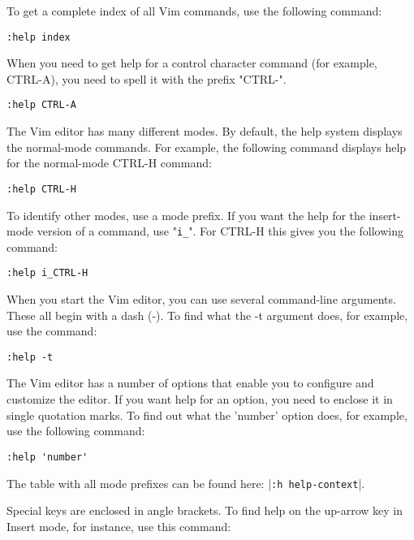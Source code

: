 To get a complete index of all Vim commands, use the following command:

 \begin{Verbatim}[samepage=true]
 :help index
 \end{Verbatim}

When you need to get help for a control character command (for example, CTRL-A), you need to spell it with the prefix "CTRL-".

 \begin{Verbatim}[samepage=true]
 :help CTRL-A
 \end{Verbatim}

The Vim editor has many different modes.
By default, the help system displays the normal-mode commands.
For example, the following command displays help for the normal-mode CTRL-H command: 

 \begin{Verbatim}[samepage=true]
 :help CTRL-H
 \end{Verbatim}

To identify other modes, use a mode prefix.
If you want the help for the insert-mode version of a command, use "\verb!i_!".
For CTRL-H this gives you the following command: 

 \begin{Verbatim}[samepage=true]
 :help i_CTRL-H
 \end{Verbatim}

When you start the Vim editor, you can use several command-line arguments.
These all begin with a dash (-).
To find what the -t argument does, for example, use the command: 

 \begin{Verbatim}[samepage=true]
 :help -t
 \end{Verbatim}

The Vim editor has a number of options that enable you to configure and customize the editor.
If you want help for an option, you need to enclose it in single quotation marks.
To find out what the 'number' option does, for example, use the following command: 

 \begin{Verbatim}[samepage=true]
 :help 'number'
 \end{Verbatim}

The table with all mode prefixes can be found here: |\verb!:h help-context!|.

Special keys are enclosed in angle brackets.
To find help on the up-arrow key in Insert mode, for instance, use this command: 

